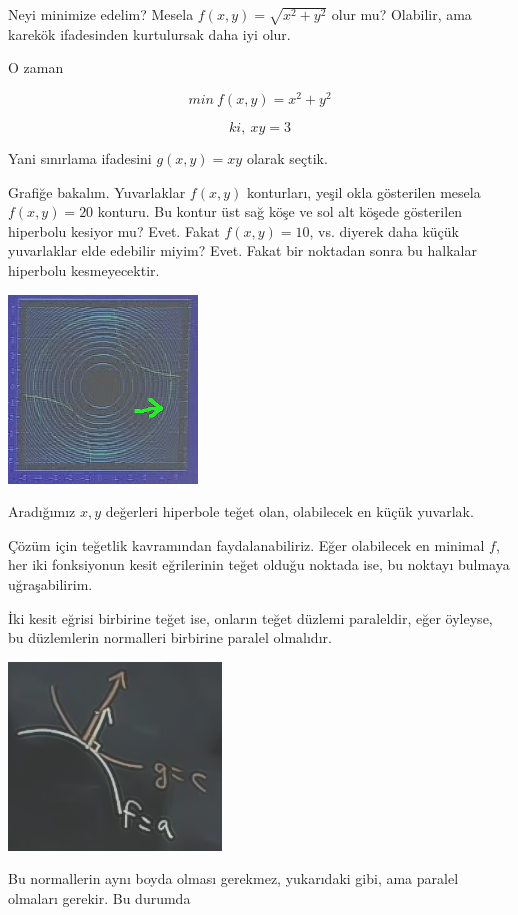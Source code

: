\documentclass[12pt,fleqn]{article}\usepackage{../../common}
\begin{document}
Neyi minimize edelim? Mesela $f(x,y) = \sqrt{x^2 + y^2}$ olur mu? Olabilir,
ama karekök ifadesinden kurtulursak daha iyi olur. 

O zaman

$$ min \ f(x,y) = x^2 + y^2 $$

$$ ki, \ xy = 3  $$

Yani sınırlama ifadesini $g(x,y) = xy$ olarak seçtik. 

Grafiğe bakalım. Yuvarlaklar $f(x,y)$ konturları, yeşil okla gösterilen
mesela $f(x,y) = 20$ konturu. Bu kontur üst sağ köşe ve sol alt köşede
gösterilen hiperbolu kesiyor mu? Evet. Fakat $f(x,y) = 10$, vs. diyerek
daha küçük yuvarlaklar elde edebilir miyim? Evet. Fakat bir noktadan sonra
bu halkalar hiperbolu kesmeyecektir. 
\begin{center}
\includegraphics[height=5cm]{13_2.png}
\end{center}
Aradığımız $x,y$ değerleri hiperbole teğet olan, olabilecek en küçük
yuvarlak.

Çözüm için teğetlik kavramından faydalanabiliriz. Eğer olabilecek en
minimal $f$, her iki fonksiyonun kesit eğrilerinin teğet olduğu noktada
ise, bu noktayı bulmaya uğraşabilirim. 

İki kesit eğrisi birbirine teğet ise, onların teğet düzlemi paraleldir,
eğer öyleyse, bu düzlemlerin normalleri birbirine paralel olmalıdır. 
\begin{center}
\includegraphics[height=5cm]{13_3.png}
\end{center}
Bu normallerin aynı boyda olması gerekmez, yukarıdaki gibi, ama paralel
olmaları gerekir. Bu durumda 
\end{document}
